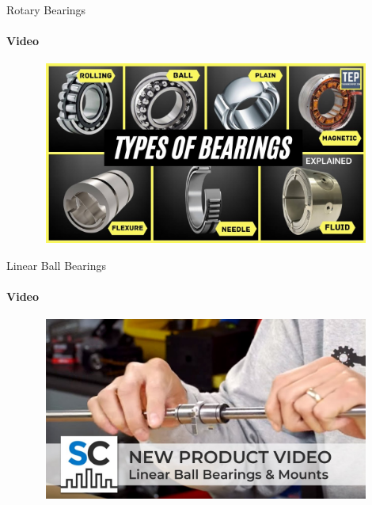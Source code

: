 \documentclass[aspectratio=169]{beamer}
\begin{document}
\begin{frame}[t]{Rotary Bearings}
    \framesubtitle{Video}
    \vspace{-0.6cm}
    \begin{figure}[H]
        \href{https://youtu.be/8q25EUszBSI}{
            \centering\includegraphics[height=6cm,width=1\textwidth,keepaspectratio]{bearing1_video.jpg}}
        \label{fig:bearing1_video.jpg}
    \end{figure}
\end{frame}

\begin{frame}[t]{Linear Ball Bearings}
    \framesubtitle{Video}
    \vspace{-0.6cm}
    \begin{figure}[H]
        \href{https://youtu.be/leTXJqZeqPA}{
            \centering\includegraphics[height=6cm,width=1\textwidth,keepaspectratio]{linearbearings_video.jpg}}
        \label{fig:linearbearings_video.jpg}
    \end{figure}
\end{frame}
\end{document}
